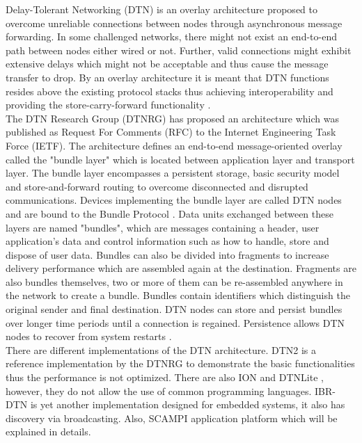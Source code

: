 Delay-Tolerant Networking (DTN) is an overlay architecture proposed to overcome unreliable connections between nodes through asynchronous message forwarding. In some challenged networks, there might not exist an end-to-end path between nodes either wired or not. Further, valid connections might exhibit extensive delays which might not be acceptable and thus cause the message transfer to drop. By an overlay architecture it is meant that DTN functions resides above the existing protocol stacks thus achieving interoperability and providing the store-carry-forward functionality \cite{Fall:2003:DNA:863955.863960}.\\

\noindent The DTN Research Group (DTNRG) has proposed an architecture which was published as Request For Comments (RFC) to the Internet Engineering Task Force (IETF). The architecture defines an end-to-end message-oriented overlay called the "bundle layer" which is located  between  application layer and  transport layer. The bundle layer encompasses a persistent storage, basic security model and store-and-forward routing to overcome disconnected and disrupted communications. Devices implementing the bundle layer are called DTN nodes and are bound to the Bundle Protocol \cite{scott2007bundle}. Data units exchanged between these layers are named "bundles",  which are messages containing a header, user application's data and control information such as how to handle, store and dispose of user data. Bundles can also be divided into fragments  to increase delivery performance which are assembled again at the destination. Fragments are also bundles themselves, two or more of them can be re-assembled anywhere in the network to create a bundle. Bundles contain identifiers which distinguish the original sender and final destination. DTN nodes can store and persist bundles over longer time periods until a connection is regained.  Persistence allows DTN nodes to recover from system restarts \cite{fall2007delay}.\\


\noindent There are different implementations of the DTN architecture. DTN2 \cite{demmer2005dtn2} is a reference implementation by the DTNRG to demonstrate the basic functionalities thus the performance is not optimized. There are also ION \cite{burleigh2006interplanetary} and DTNLite \cite{patra2003dtnlite}, however, they do not allow the use of common programming languages. IBR-DTN \cite{Doering:2008:IEI:1409985.1410008} is yet another implementation designed for embedded systems, it also has discovery via broadcasting. Also, SCAMPI \cite{Karkkainen:2012:SAP:2348616.2348636} application platform which will be explained in details.




